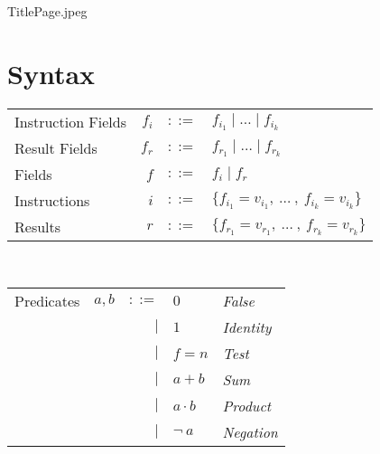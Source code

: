 \documentclass[12pt, letterpaper]{article}
\begin{document}

TitlePage.jpeg


\cleardoublepage
\section{Syntax}

  \begin{tabular}{l r c l}
    Instruction Fields   & $f_{i}$   & $::=$     & $f_{i_{1}} \mid \dots \mid f_{i_{k}}$\\
    Result Fields        & $f_{r}$   & $::=$     & $f_{r_{1}} \mid \dots \mid f_{r_{k}}$\\
    Fields               & $f$       & $::=$     & $f_i \mid f_r$ \\
    Instructions         & $i$       & $::=$     & $\{f_{i_{1}} = v_{i_{1}} ,\ \dots\ ,\ f_{i_{k}} = v_{i_{k}}\}$\\
    Results              & $r$       & $::=$     & $\{f_{r_{1}} = v_{r_{1}} ,\ \dots\ ,\ f_{r_{k}} = v_{r_{k}}\}$\\
  \end{tabular}\\

  \begin{tabular}{l c r l l}
    Predicates  & $a,b$     & $::=$  & $0$          & \textit{False} \\
                &           & $\mid$ & $1$          & \textit{Identity}    \\
                &           & $\mid$ & $f=n$        & \textit{Test} \\  
                &           & $\mid$ & $a + b$      & \textit{Sum}      \\
                &           & $\mid$ & $a \cdot b$  & \textit{Product}  \\
                &           & $\mid$ & $\neg \ a$   & \textit{Negation}
  \end{tabular}\\
\end{document}
